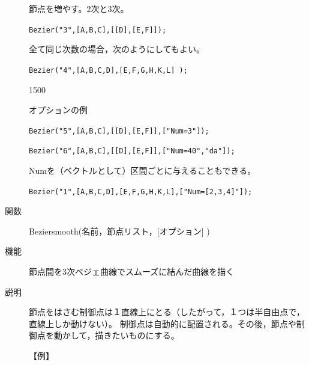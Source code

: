 \documentclass[papersize,a4paper,10pt,uplatex]{jsarticle}
\begin{document}
\begin{description}
節点を増やす。2次と3次。

\verb|Bezier("3",[A,B,C],[[D],[E,F]]);|

\vspace{12mm}

全て同じ次数の場合，次のようにしてもよい。

\verb|Bezier("4",[A,B,C,D],[E,F,G,H,K,L] ); |

\begin{layer}{150}{0}
\end{layer}

\vspace{30mm}

オプションの例

\verb|Bezier("5",[A,B,C],[[D],[E,F]],["Num=3"]);|

\hspace{20mm}

\vspace{-5mm}


\verb|Bezier("6",[A,B,C],[[D],[E,F]],["Num=40","da"]);|

\vspace{-2mm}

\hspace{20mm}

Numを（ベクトルとして）区間ごとに与えることもできる。

\verb|Bezier("1",[A,B,C,D],[E,F,G,H,K,L],["Num=[2,3,4]"]);|

\hspace{10mm} 


\vspace{\baselineskip}
\hypertarget{beziersmooth}{}
\item[関数]Beziersmooth(名前，節点リスト，[オプション] )
\item[機能]節点間を3次ベジェ曲線でスムーズに結んだ曲線を描く
\item[説明]節点をはさむ制御点は１直線上にとる（したがって，１つは半自由点で，直線上しか動けない）。
制御点は自動的に配置される。その後，節点や制御点を動かして，描きたいものにする。

\vspace{\baselineskip}
【例】


\end{description}
\end{document}

